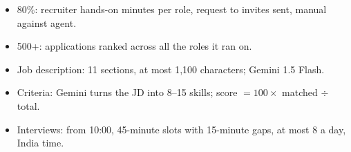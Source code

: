 \begin{sayit}
\begin{itemize}
  \item 80\%: recruiter hands-on minutes per role, request to invites sent, manual against agent.
  \item 500+: applications ranked across all the roles it ran on.
  \item Job description: 11 sections, at most 1,100 characters; Gemini 1.5 Flash.
  \item Criteria: Gemini turns the JD into 8--15 skills; score $= 100 \times$ matched $\div$ total.
  \item Interviews: from 10:00, 45-minute slots with 15-minute gaps, at most 8 a day, India time.
\end{itemize}
\end{sayit}
